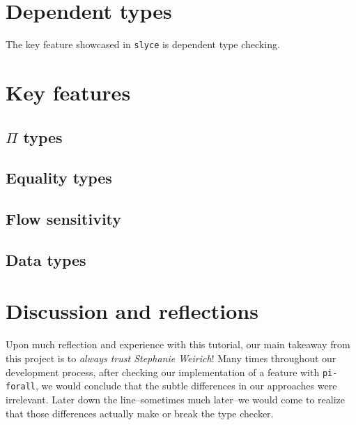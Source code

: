 




\section{Dependent types}
The key feature showcased in \texttt{slyce} is dependent type checking.





\section{Key features}
\subsection{$\Pi$ types}
\subsection{Equality types}\label{equal}
\subsection{Flow sensitivity}\label{flow}
\subsection{Data types}

\section{Discussion and reflections}\label{reflection}
Upon much reflection and experience with this tutorial, our main takeaway from this project is to \emph{always trust Stephanie Weirich}!
Many times throughout our development process, after checking our implementation of a feature with \texttt{pi-forall}, we would conclude that the subtle differences in our approaches were irrelevant.
Later down the line--sometimes much later--we would come to realize that those differences actually make or break the type checker.

